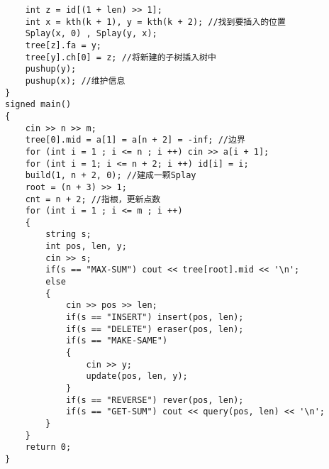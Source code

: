 \documentclass[E:/GsjzTle/main/main.tex]{subfiles}
\begin{document}
\begin{lstlisting}
	int z = id[(1 + len) >> 1];
	int x = kth(k + 1), y = kth(k + 2); //找到要插入的位置
	Splay(x, 0) , Splay(y, x);
	tree[z].fa = y;
	tree[y].ch[0] = z; //将新建的子树插入树中
	pushup(y);
	pushup(x); //维护信息
}
signed main()
{
	cin >> n >> m;
	tree[0].mid = a[1] = a[n + 2] = -inf; //边界
	for (int i = 1 ; i <= n ; i ++) cin >> a[i + 1];
	for (int i = 1; i <= n + 2; i ++) id[i] = i;
	build(1, n + 2, 0); //建成一颗Splay
	root = (n + 3) >> 1;
	cnt = n + 2; //指根，更新点数
	for (int i = 1 ; i <= m ; i ++)
	{
		string s;
		int pos, len, y;
		cin >> s;
		if(s == "MAX-SUM") cout << tree[root].mid << '\n';
		else
		{
			cin >> pos >> len;
			if(s == "INSERT") insert(pos, len);
			if(s == "DELETE") eraser(pos, len);
			if(s == "MAKE-SAME")
			{
				cin >> y;
				update(pos, len, y);
			}
			if(s == "REVERSE") rever(pos, len);
			if(s == "GET-SUM") cout << query(pos, len) << '\n';
		} 
	}
	return 0;
}
\end{lstlisting}
\end{document}
